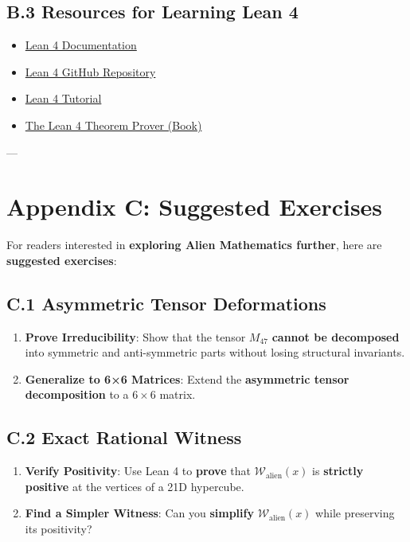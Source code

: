 \documentclass[11pt, a4paper]{article}
\begin{document}
\subsection*{B.3 Resources for Learning Lean 4}
\begin{itemize}
    \item \href{https://leanprover.github.io/lean4_doc/}{Lean 4 Documentation}
    \item \href{https://github.com/leanprover/lean4}{Lean 4 GitHub Repository}
    \item \href{https://leanprover.github.io/tutorial/}{Lean 4 Tutorial}
    \item \href{https://leanprover.github.io/theorem_proving_in_lean4/}{The Lean 4 Theorem Prover (Book)}
\end{itemize}

---
\newpage
\section*{Appendix C: Suggested Exercises}
For readers interested in \textbf{exploring Alien Mathematics further}, here are \textbf{suggested exercises}:

\subsection*{C.1 Asymmetric Tensor Deformations}
\begin{enumerate}
    \item \textbf{Prove Irreducibility}: Show that the tensor \(M_{47}\) \textbf{cannot be decomposed} into symmetric and anti-symmetric parts without losing structural invariants.
    \item \textbf{Generalize to 6×6 Matrices}: Extend the \textbf{asymmetric tensor decomposition} to a \(6 \times 6\) matrix.
\end{enumerate}

\subsection*{C.2 Exact Rational Witness}
\begin{enumerate}
    \item \textbf{Verify Positivity}: Use Lean 4 to \textbf{prove} that \(\mathcal{W}_{\text{alien}}(x)\) is \textbf{strictly positive} at the vertices of a 21D hypercube.
    \item \textbf{Find a Simpler Witness}: Can you \textbf{simplify} \(\mathcal{W}_{\text{alien}}(x)\) while preserving its positivity?
\end{enumerate}
\end{document}
